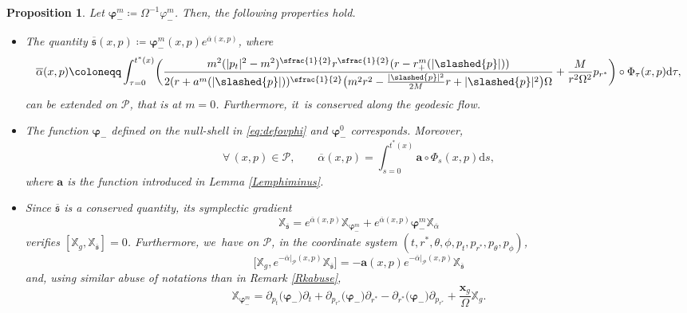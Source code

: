 \documentclass[10pt]{amsart}
\theoremstyle{plain}
\newtheorem{proposition}{Proposition}[section]
\theoremstyle{definition}
\newcommand\T{{\mathbb{X}}}
\newcommand\dr{{\mathrm{d}}}
\begin{document}
\begin{proposition}
Let $\pmb{\varphi}_-^m\coloneqq \Omega^{-1} \varphi_-^m$. Then, the following properties hold.
\begin{itemize}
\item The quantity $\overline{\mathfrak{s}} (x,p) \coloneqq \pmb{\varphi}_-^m (x,p) e^{\overline{\alpha} (x,p)}$, where
\[
\overline{\alpha}(x,p)\coloneqq \int_{\tau=0}^{t^*(x)} \biggl(\frac{m^2(|p_t|^2-m^2)^{\sfrac{1}{2}}r^{\sfrac{1}{2}}(r-r^{m}_+(|\slashed{p}|))}{2(r+a^{m}(|\slashed{p}|))^{\sfrac{1}{2}}\bigl(m^2 r^2-\frac{|\slashed{p}|^2}{2M}r+|\slashed{p}|^2\bigr)\Omega}+ \frac{M}{r^2 \Omega^2}p_{r^*} \biggr) \circ \Phi_{\tau}(x,p) \dr \tau,
\]
can be extended on $\mathcal{P}$, that is at $m=0$. Furthermore, it~is conserved along the geodesic flow.
\item The function $\pmb{\varphi}_-$ defined on the null-shell in \eqref{eq:defovphi} and $\pmb{\varphi}_-^0$ corresponds. Moreover,
\[
\forall \, (x,p) \in \mathcal{P}, \qquad \overline{\alpha} (x,p)= \int_{s=0}^{t^*(x)} \pmb{a} \circ \Phi_{s}(x,p) \dr s,
\]
where $\pmb{a}$ is the function introduced in Lemma \ref{Lemphiminus}.
\item Since $\overline{\mathfrak{s}}$ is a conserved quantity, its symplectic gradient
\[\T_{\overline{\mathfrak{s}}}=e^{\overline{\alpha} (x,p)}\T_{\pmb{\varphi}_-^m}+ e^{\overline{\alpha} (x,p)}\pmb{\varphi}_-^m\T_{\overline{\alpha}}\]
verifies $[\T_g, \T_{\overline{\mathfrak{s}}}]=0$. Furthermore, we~have on $\mathcal{P}$, in the coordinate system $(t,r^*,\theta, \phi, p_t,p_{r^*},p_\theta, p_\phi)$,
\[
\bigl[\T_g, e^{-\overline{\alpha}\vert_{\mathcal{P}}(x,p)} \T_{\overline{\mathfrak{s}}} \bigr] = -\pmb{a}(x,p) e^{-\overline{\alpha}\vert_{\mathcal{P}}(x,p)}\T_{\overline{\mathfrak{s}}}
\]
and, using similar abuse of notations than in Remark \ref{Rkabuse},
\[
\T_{\pmb{\varphi}_-^m} = \partial_{p_t} \bigl(\pmb{\varphi}_- \bigr)\partial_t+\partial_{p_{r^*}} \bigl(\pmb{\varphi}_- \bigr) \partial_{r^*}-\partial_{r^*}\bigl(\pmb{\varphi}_- \bigr) \partial_{p_{r^*}}+\frac{\pmb{x}_g}{\Omega} \T_g.
\]
\end{itemize}
\end{proposition}
\end{document}
